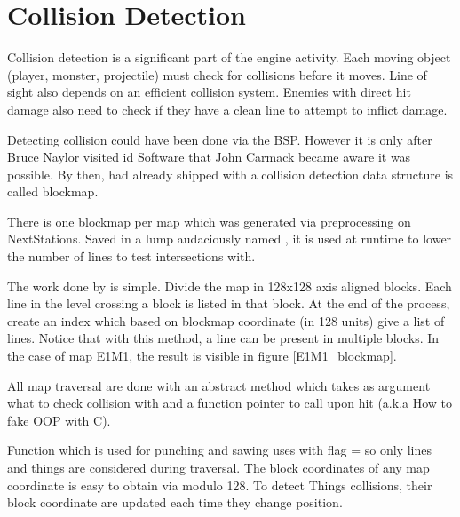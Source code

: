 \section{Collision Detection} \label{blockmapdetails}
Collision detection is a significant part of the engine activity. Each moving object (player, monster, projectile) must check for collisions before it moves. Line of sight also depends on an efficient collision system. Enemies with direct hit damage also need to check if they have a clean line to attempt to inflict damage.\\
\par
Detecting collision could have been done via the BSP. However it is only after Bruce Naylor visited id Software that John Carmack became aware it was possible. By then, \doom{} had already shipped with a collision detection data structure is called blockmap.\\
\par
\vspace{10pt}
\par
There is one blockmap per map which was generated via  preprocessing on NextStations. Saved in a lump audaciously named , it is used at runtime to lower the number of lines to test intersections with.\\
\par
The work done by  is simple. Divide the map in 128x128 axis aligned blocks. Each line in the level crossing a block is listed in that block. At the end of the process, create an index which based on blockmap coordinate (in 128 units) give a list of lines. Notice that with this method, a line can be present in multiple blocks. In the case of map E1M1, the result is visible in figure \ref{E1M1_blockmap}.


All map traversal are done with an abstract method  which takes as argument what to check collision with and a function pointer to call upon hit (a.k.a How to fake OOP with C).\\
\par
{}
\par
Function  which is used for punching and sawing uses  with flag =  so only lines and things are considered during traversal. The block coordinates of any map coordinate is easy to obtain via modulo 128. To detect Things collisions, their block coordinate are updated each time they change position.\\
\par
{}
